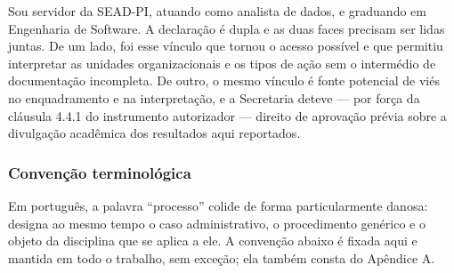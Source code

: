Sou servidor da SEAD-PI, atuando como analista de dados, e graduando em Engenharia de
Software. A declaração é dupla e as duas faces precisam ser lidas juntas. De um lado, foi esse
vínculo que tornou o acesso possível e que permitiu interpretar as unidades organizacionais e os
tipos de ação sem o intermédio de documentação incompleta. De outro, o mesmo vínculo é fonte
potencial de viés no enquadramento e na interpretação, e a Secretaria deteve --- por força da
cláusula 4.4.1 do instrumento autorizador --- direito de aprovação prévia sobre a divulgação
acadêmica dos resultados aqui reportados.

\subsubsection*{Convenção terminológica}

Em português, a palavra ``processo'' colide de forma particularmente danosa: designa ao mesmo tempo
o caso administrativo, o procedimento genérico e o objeto da disciplina que se aplica a ele. A
convenção abaixo é fixada aqui e mantida em todo o trabalho, sem exceção; ela também consta do
Apêndice A.

